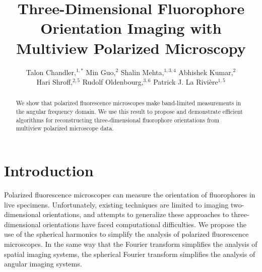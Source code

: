 \documentclass[letterpaper,10pt]{article}
\begin{document}
\title{Three-Dimensional Fluorophore Orientation Imaging with Multiview Polarized Microscopy}

\author{Talon Chandler,${}^{1,*}$ Min Guo,${}^2$ Shalin Mehta,${}^{1,3,4}$ Abhishek Kumar,${}^2$\\ Hari Shroff,${}^{2,5}$ Rudolf Oldenbourg,${}^{3,6}$ Patrick J. La Rivi\`ere${}^{1,5}$}

\address{${}^1$Department of Radiology, University of Chicago, Chicago, Illinois 60637, USA.\\ ${}^2$Section on High Resolution Optical Imaging, National Institute of Biomedical Imaging\\ and Bioengineering, National Institutes of Health, Bethesda, Maryland 20892, USA.\\ ${}^3$Bell Center, Marine Biological Laboratory, Woods Hole, Massachusetts 02543, USA.\\ ${}^4$(present address) Chan Zuckerberg Biohub, San Francisco, California 94158, USA.\\ ${}^5$Whitman Center, Marine Biological Laboratory, Woods Hole, Massachusetts 02543, USA.\\ ${}^6$Department of Physics, Brown University, Providence, Rhode Island 02912, USA.}

\begin{abstract}
  \hspace{-0.75em} We show that polarized fluorescence microscopes make
  band-limited measurements in the angular frequency domain. We use this result
  to propose and demonstrate efficient algorithms for reconstructing
  three-dimensional fluorophore orientations from multiview polarized microscope
  data.
\end{abstract}
\vspace{0.03em}
\vspace{-1em}
\section{Introduction}
Polarized fluorescence microscopes can measure the orientation of fluorophores
in live specimens\cite{weiss1999}. Unfortunately, existing techniques are
limited to imaging two-dimensional orientations, and attempts to generalize
these approaches to three-dimensional orientations have faced computational
difficulties. We propose the use of the spherical harmonics to simplify the
analysis of polarized fluorescence microscopes. In the same way that the Fourier
transform simplifies the analysis of spatial imaging systems, the spherical
Fourier transform simplifies the analysis of angular imaging systems.
\end{document}
